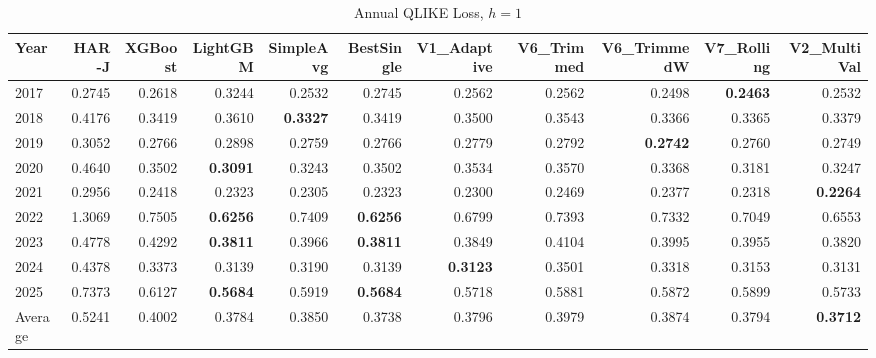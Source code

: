 \begin{table}[htbp]
\centering
\caption{Annual QLIKE Loss, $h=1$}
\label{tab:qlike_annual_h1}
\begin{tabular}{lrrrrrrrrrr}
\toprule
Year & HAR-J & XGBoost & LightGBM & SimpleAvg & BestSingle & V1\_Adaptive & V6\_Trimmed & V6\_TrimmedW & V7\_Rolling & V2\_MultiVal \\
\midrule
2017 & 0.2745 & 0.2618 & 0.3244 & 0.2532 & 0.2745 & 0.2562 & 0.2562 & 0.2498 & \textbf{0.2463} & 0.2532 \\
2018 & 0.4176 & 0.3419 & 0.3610 & \textbf{0.3327} & 0.3419 & 0.3500 & 0.3543 & 0.3366 & 0.3365 & 0.3379 \\
2019 & 0.3052 & 0.2766 & 0.2898 & 0.2759 & 0.2766 & 0.2779 & 0.2792 & \textbf{0.2742} & 0.2760 & 0.2749 \\
2020 & 0.4640 & 0.3502 & \textbf{0.3091} & 0.3243 & 0.3502 & 0.3534 & 0.3570 & 0.3368 & 0.3181 & 0.3247 \\
2021 & 0.2956 & 0.2418 & 0.2323 & 0.2305 & 0.2323 & 0.2300 & 0.2469 & 0.2377 & 0.2318 & \textbf{0.2264} \\
2022 & 1.3069 & 0.7505 & \textbf{0.6256} & 0.7409 & \textbf{0.6256} & 0.6799 & 0.7393 & 0.7332 & 0.7049 & 0.6553 \\
2023 & 0.4778 & 0.4292 & \textbf{0.3811} & 0.3966 & \textbf{0.3811} & 0.3849 & 0.4104 & 0.3995 & 0.3955 & 0.3820 \\
2024 & 0.4378 & 0.3373 & 0.3139 & 0.3190 & 0.3139 & \textbf{0.3123} & 0.3501 & 0.3318 & 0.3153 & 0.3131 \\
2025 & 0.7373 & 0.6127 & \textbf{0.5684} & 0.5919 & \textbf{0.5684} & 0.5718 & 0.5881 & 0.5872 & 0.5899 & 0.5733 \\
\midrule
Average & 0.5241 & 0.4002 & 0.3784 & 0.3850 & 0.3738 & 0.3796 & 0.3979 & 0.3874 & 0.3794 & \textbf{0.3712} \\
\bottomrule
\end{tabular}
\end{table}